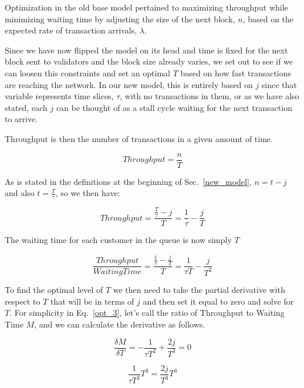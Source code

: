 \documentclass[conference]{IEEEtran}
\begin{document}
Optimization in the old base model pertained to maximizing throughput
while minimizing waiting time by adjusting the size of the next block, $n$,
based on the expected rate of transaction arrivals, $\lambda$. 

Since we have now flipped the model on its head and time is fixed for the next
block sent to validators and the block size already varies, we set out to see if
we can loosen this constraints and set an optimal $T$ based on how fast 
transactions are reaching the network. In our new model, this is entirely based
on $j$ since that variable represents time slices, $\tau$, with no transactions in them,
or as we have also stated, each $j$ can be thought of as a stall cycle waiting for
the next transaction to arrive.

Throughput is then the number of transactions in a given amount of time. 

\begin{equation}
  Throughput = \frac{n}{T}\label{opt_1}
\end{equation}

As is stated in the definitions at the beginning of Sec.~\ref{new_model},
$n=t-j$ and also $t = \frac{T}{\tau}$, so we then have:

\begin{equation}
  Throughput = \frac{\frac{T}{\tau}-j}{T}=\frac{1}{\tau}-\frac{j}{T}\label{opt_2}
\end{equation}

The waiting time for each customer in the queue is now simply $T$

\begin{equation}
  \frac{Throughput}{WaitingTime} = \frac{\frac{1}{\tau}-\frac{j}{T}}{T} = \frac{1}{\tau T}-\frac{j}{T^2}\label{opt_2}
\end{equation}

To find the optimal level of $T$ we then need to take the partial derivative with respect to $T$ that will
be in terms of $j$ and then set it equal to zero and solve for $T$. For simplicity in Eq.~\ref{opt_3}, 
let's call the ratio of Throughput to Waiting Time $M$, and we can calculate the derivative as follows.

\begin{equation}
  \frac{\delta M}{\delta T} = -\frac{1}{\tau T^2}+\frac{2j}{T^3}=0\label{opt_3}
\end{equation}

\begin{equation}
  \frac{1}{\tau T^2}T^3=\frac{2j}{T^3}T^3\label{opt_4}
\end{equation}
\end{document}
